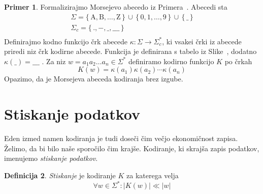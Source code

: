 \documentclass{amsart}
\theoremstyle{definition} %
\newtheorem{definicija}{Definicija}[section]
\newtheorem{primer}[definicija]{Primer}
\newtheorem{opomba}[definicija]{Opomba}
\theoremstyle{plain} %
\begin{document}

\begin{primer}
    
    Formalizirajmo Morsejevo abecedo iz Primera~. Abecedi sta
    \begin{gather*}
        \Sigma = \{\, \text{A},  \text{B}, \ldots, \text{Z} \,\} \, \cup \, \{\, 0, 1, \ldots, 9 \,\} \, \cup \, \{\, \_ \,\} \\
        \Sigma_c = \{\, ., -, \_, \_\_\_ \,\} \\
    \end{gather*}
    Definirajmo kodno funkcijo črk abecede $ \kappa \colon \Sigma \to \Sigma_c^* $, ki vsakei črki iz abecede
    priredi niz črk kodirne abecede. Funkcija je definirana s tabelo iz Slike~,
    dodatno $ \kappa(\_) = \_\_\_ $ . Za niz $ w = a_1a_2 \ldots a_n \in \Sigma^* $ definiramo kodirno 
    funkcijo $ K $ po črkah
    \[
        K(w) = \kappa(a_1)\kappa(a_2)\cdots\kappa(a_n)
    \]
    Opazimo, da je Morsejeva abeceda kodiranja brez izgube.

\end{primer}

\section{Stiskanje podatkov}

Eden izmed namen kodiranja je tudi doseči čim večjo ekonomičnost zapisa. Želimo, da bi bilo naše sporočilo
čim krajše. Kodiranje, ki skrajša zapis podatkov, imenujemo \textit{stiskanje podatkov}.

\begin{definicija}
    
    \textit{Stiskanje} je kodiranje $ K $ za katerega velja 
    \[ 
    \forall w \in \Sigma^* \colon \left\lvert K(w)\right\rvert \ll \left\lvert w \right\rvert
    \]

\end{definicija}

    

\end{document}
